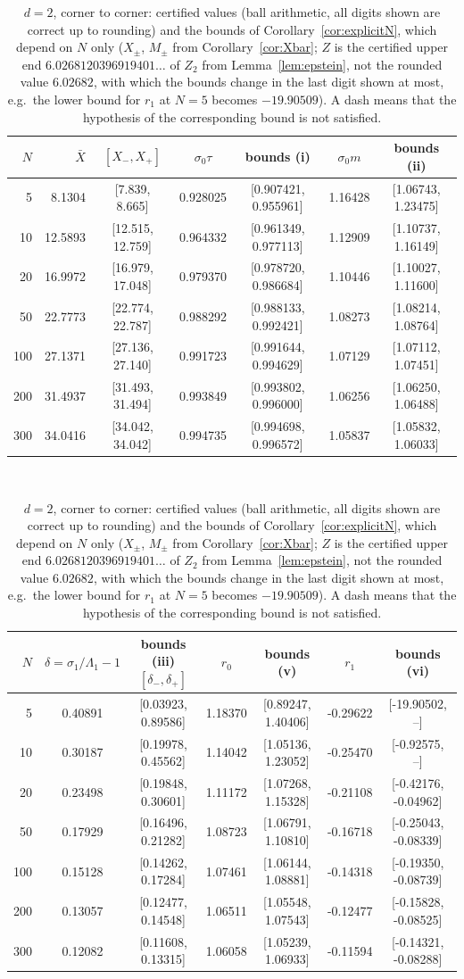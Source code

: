 \documentclass[11pt,a4paper]{article}
\newcommand{\Xb}{\bar X}
\theoremstyle{plain}
\theoremstyle{definition}
\numberwithin{equation}{section}
\begin{document}
\begin{table}[ht]\centering\footnotesize
\begin{tabular}{rrccccc}\toprule
$N$ & $\Xb$ & $[X_-,X_+]$ & $\sigma_0\tau$ & bounds (i) & $\sigma_0m$ & bounds (ii)\\\midrule
5 & 8.1304 & [7.839, 8.665] & 0.928025 & [0.907421, 0.955961] & 1.16428 & [1.06743, 1.23475]\\
10 & 12.5893 & [12.515, 12.759] & 0.964332 & [0.961349, 0.977113] & 1.12909 & [1.10737, 1.16149]\\
20 & 16.9972 & [16.979, 17.048] & 0.979370 & [0.978720, 0.986684] & 1.10446 & [1.10027, 1.11600]\\
50 & 22.7773 & [22.774, 22.787] & 0.988292 & [0.988133, 0.992421] & 1.08273 & [1.08214, 1.08764]\\
100 & 27.1371 & [27.136, 27.140] & 0.991723 & [0.991644, 0.994629] & 1.07129 & [1.07112, 1.07451]\\
200 & 31.4937 & [31.493, 31.494] & 0.993849 & [0.993802, 0.996000] & 1.06256 & [1.06250, 1.06488]\\
300 & 34.0416 & [34.042, 34.042] & 0.994735 & [0.994698, 0.996572] & 1.05837 & [1.05832, 1.06033]\\
\bottomrule\end{tabular}
\\[6pt]\begin{tabular}{rcccccc}\toprule
$N$ & $\delta=\sigma_1/\Lambda_1-1$ & bounds (iii) $[\delta_-,\delta_+]$ & $r_0$ & bounds (v) & $r_1$ & bounds (vi)\\\midrule
5 & 0.40891 & [0.03923, 0.89586] & 1.18370 & [0.89247, 1.40406] & -0.29622 & [-19.90502, --]\\
10 & 0.30187 & [0.19978, 0.45562] & 1.14042 & [1.05136, 1.23052] & -0.25470 & [-0.92575, --]\\
20 & 0.23498 & [0.19848, 0.30601] & 1.11172 & [1.07268, 1.15328] & -0.21108 & [-0.42176, -0.04962]\\
50 & 0.17929 & [0.16496, 0.21282] & 1.08723 & [1.06791, 1.10810] & -0.16718 & [-0.25043, -0.08339]\\
100 & 0.15128 & [0.14262, 0.17284] & 1.07461 & [1.06144, 1.08881] & -0.14318 & [-0.19350, -0.08739]\\
200 & 0.13057 & [0.12477, 0.14548] & 1.06511 & [1.05548, 1.07543] & -0.12477 & [-0.15828, -0.08525]\\
300 & 0.12082 & [0.11608, 0.13315] & 1.06058 & [1.05239, 1.06933] & -0.11594 & [-0.14321, -0.08288]\\
\bottomrule\end{tabular}
\caption{$d=2$, corner to corner: certified values (ball arithmetic, all digits shown are correct up to rounding) and the bounds of Corollary~\ref{cor:explicitN}, which depend on $N$ only ($X_\pm$, $M_\pm$ from Corollary~\ref{cor:Xbar}; $Z$ is the certified upper end $6.0268120396919401\ldots$ of $Z_2$ from Lemma~\ref{lem:epstein}, not the rounded value $6.02682$, with which the bounds change in the last digit shown at most, e.g.\ the lower bound for $r_1$ at $N=5$ becomes $-19.90509$). A dash means that the hypothesis of the corresponding bound is not satisfied.}\label{tab:cc2}\end{table}
\end{document}
